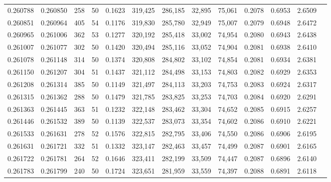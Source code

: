 \begin{tabular}{rrrrrrrrrrrrr}
0.260788 & 0.260850 &   258 &  50 &                                     0.1623 & 319,425 & 286,185 &  32,895 &  75,061 & 0.2078 & 0.6953 & 2.6509 \\
0.260851 & 0.260964 &   405 &  54 &                                     0.1176 & 319,830 & 285,780 &  32,949 &  75,007 & 0.2079 & 0.6948 & 2.6472 \\
0.260965 & 0.261006 &   362 &  53 &                                     0.1277 & 320,192 & 285,418 &  33,002 &  74,954 & 0.2080 & 0.6943 & 2.6438 \\
0.261007 & 0.261077 &   302 &  50 &                                     0.1420 & 320,494 & 285,116 &  33,052 &  74,904 & 0.2081 & 0.6938 & 2.6410 \\
0.261078 & 0.261148 &   314 &  50 &                                     0.1374 & 320,808 & 284,802 &  33,102 &  74,854 & 0.2081 & 0.6934 & 2.6381 \\
0.261150 & 0.261207 &   304 &  51 &                                     0.1437 & 321,112 & 284,498 &  33,153 &  74,803 & 0.2082 & 0.6929 & 2.6353 \\
0.261208 & 0.261314 &   385 &  50 &                                     0.1149 & 321,497 & 284,113 &  33,203 &  74,753 & 0.2083 & 0.6924 & 2.6317 \\
0.261315 & 0.261362 &   288 &  50 &                                     0.1479 & 321,785 & 283,825 &  33,253 &  74,703 & 0.2084 & 0.6920 & 2.6291 \\
0.261363 & 0.261445 &   363 &  51 &                                     0.1232 & 322,148 & 283,462 &  33,304 &  74,652 & 0.2085 & 0.6915 & 2.6257 \\
0.261446 & 0.261532 &   389 &  50 &                                     0.1139 & 322,537 & 283,073 &  33,354 &  74,602 & 0.2086 & 0.6910 & 2.6221 \\
0.261533 & 0.261631 &   278 &  52 &                                     0.1576 & 322,815 & 282,795 &  33,406 &  74,550 & 0.2086 & 0.6906 & 2.6195 \\
0.261631 & 0.261721 &   332 &  51 &                                     0.1332 & 323,147 & 282,463 &  33,457 &  74,499 & 0.2087 & 0.6901 & 2.6165 \\
0.261722 & 0.261781 &   264 &  52 &                                     0.1646 & 323,411 & 282,199 &  33,509 &  74,447 & 0.2087 & 0.6896 & 2.6140 \\
0.261783 & 0.261799 &   240 &  50 &                                     0.1724 & 323,651 & 281,959 &  33,559 &  74,397 & 0.2088 & 0.6891 & 2.6118 \\

\end{tabular}
